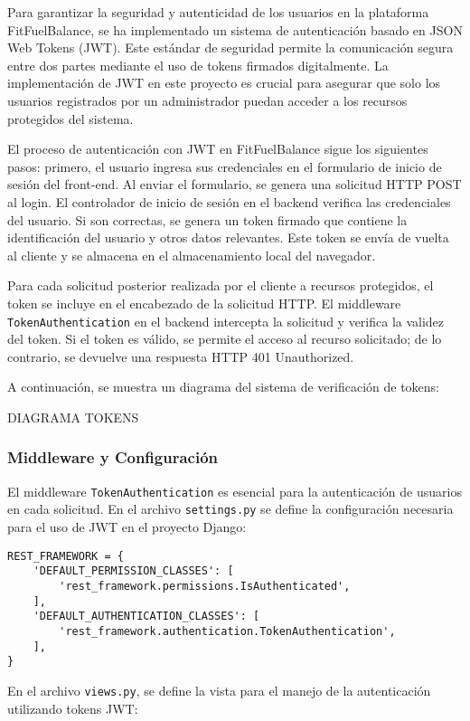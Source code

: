 Para garantizar la seguridad y autenticidad de los usuarios en la plataforma FitFuelBalance, se ha implementado un sistema de autenticación basado en JSON Web Tokens (JWT). Este estándar de seguridad permite la comunicación segura entre dos partes mediante el uso de tokens firmados digitalmente. La implementación de JWT en este proyecto es crucial para asegurar que solo los usuarios registrados por un administrador puedan acceder a los recursos protegidos del sistema.

El proceso de autenticación con JWT en FitFuelBalance sigue los siguientes pasos: primero, el usuario ingresa sus credenciales en el formulario de inicio de sesión del front-end. Al enviar el formulario, se genera una solicitud HTTP POST al login. El controlador de inicio de sesión en el backend verifica las credenciales del usuario. Si son correctas, se genera un token firmado que contiene la identificación del usuario y otros datos relevantes. Este token se envía de vuelta al cliente y se almacena en el almacenamiento local del navegador.

Para cada solicitud posterior realizada por el cliente a recursos protegidos, el token se incluye en el encabezado de la solicitud HTTP. El middleware \texttt{TokenAuthentication} en el backend intercepta la solicitud y verifica la validez del token. Si el token es válido, se permite el acceso al recurso solicitado; de lo contrario, se devuelve una respuesta HTTP 401 Unauthorized.

A continuación, se muestra un diagrama del sistema de verificación de tokens:

DIAGRAMA TOKENS

\subsubsection{Middleware y Configuración}

El middleware \texttt{TokenAuthentication} es esencial para la autenticación de usuarios en cada solicitud. En el archivo \texttt{settings.py} se define la configuración necesaria para el uso de JWT en el proyecto Django:

\begin{verbatim}
REST_FRAMEWORK = {
    'DEFAULT_PERMISSION_CLASSES': [
        'rest_framework.permissions.IsAuthenticated',
    ],
    'DEFAULT_AUTHENTICATION_CLASSES': [
        'rest_framework.authentication.TokenAuthentication',
    ],
}
\end{verbatim}

En el archivo \texttt{views.py}, se define la vista para el manejo de la autenticación utilizando tokens JWT:

